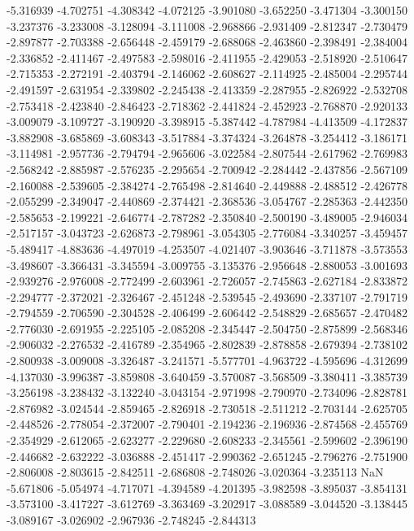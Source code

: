 -5.316939
-4.702751
-4.308342
-4.072125
-3.901080
-3.652250
-3.471304
-3.300150
-3.237376
-3.233008
-3.128094
-3.111008
-2.968866
-2.931409
-2.812347
-2.730479
-2.897877
-2.703388
-2.656448
-2.459179
-2.688068
-2.463860
-2.398491
-2.384004
-2.336852
-2.411467
-2.497583
-2.598016
-2.411955
-2.429053
-2.518920
-2.510647
-2.715353
-2.272191
-2.403794
-2.146062
-2.608627
-2.114925
-2.485004
-2.295744
-2.491597
-2.631954
-2.339802
-2.245438
-2.413359
-2.287955
-2.826922
-2.532708
-2.753418
-2.423840
-2.846423
-2.718362
-2.441824
-2.452923
-2.768870
-2.920133
-3.009079
-3.109727
-3.190920
-3.398915
-5.387442
-4.787984
-4.413509
-4.172837
-3.882908
-3.685869
-3.608343
-3.517884
-3.374324
-3.264878
-3.254412
-3.186171
-3.114981
-2.957736
-2.794794
-2.965606
-3.022584
-2.807544
-2.617962
-2.769983
-2.568242
-2.885987
-2.576235
-2.295654
-2.700942
-2.284442
-2.437856
-2.567109
-2.160088
-2.539605
-2.384274
-2.765498
-2.814640
-2.449888
-2.488512
-2.426778
-2.055299
-2.349047
-2.440869
-2.374421
-2.368536
-3.054767
-2.285363
-2.442350
-2.585653
-2.199221
-2.646774
-2.787282
-2.350840
-2.500190
-3.489005
-2.946034
-2.517157
-3.043723
-2.626873
-2.798961
-3.054305
-2.776084
-3.340257
-3.459457
-5.489417
-4.883636
-4.497019
-4.253507
-4.021407
-3.903646
-3.711878
-3.573553
-3.498607
-3.366431
-3.345594
-3.009755
-3.135376
-2.956648
-2.880053
-3.001693
-2.939276
-2.976008
-2.772499
-2.603961
-2.726057
-2.745863
-2.627184
-2.833872
-2.294777
-2.372021
-2.326467
-2.451248
-2.539545
-2.493690
-2.337107
-2.791719
-2.794559
-2.706590
-2.304528
-2.406499
-2.606442
-2.548829
-2.685657
-2.470482
-2.776030
-2.691955
-2.225105
-2.085208
-2.345447
-2.504750
-2.875899
-2.568346
-2.906032
-2.276532
-2.416789
-2.354965
-2.802839
-2.878858
-2.679394
-2.738102
-2.800938
-3.009008
-3.326487
-3.241571
-5.577701
-4.963722
-4.595696
-4.312699
-4.137030
-3.996387
-3.859808
-3.640459
-3.570087
-3.568509
-3.380411
-3.385739
-3.256198
-3.238432
-3.132240
-3.043154
-2.971998
-2.790970
-2.734096
-2.828781
-2.876982
-3.024544
-2.859465
-2.826918
-2.730518
-2.511212
-2.703144
-2.625705
-2.448526
-2.778054
-2.372007
-2.790401
-2.194236
-2.196936
-2.874568
-2.455769
-2.354929
-2.612065
-2.623277
-2.229680
-2.608233
-2.345561
-2.599602
-2.396190
-2.446682
-2.632222
-3.036888
-2.451417
-2.990362
-2.651245
-2.796276
-2.751900
-2.806008
-2.803615
-2.842511
-2.686808
-2.748026
-3.020364
-3.235113
NaN
-5.671806
-5.054974
-4.717071
-4.394589
-4.201395
-3.982598
-3.895037
-3.854131
-3.573100
-3.417227
-3.612769
-3.363469
-3.202917
-3.088589
-3.044520
-3.138445
-3.089167
-3.026902
-2.967936
-2.748245
-2.844313

